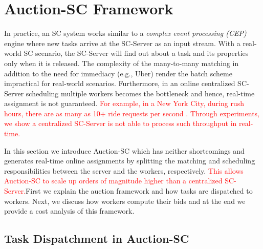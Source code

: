 \section{Auction-SC Framework}
\label{sec:onlinealgo}

In practice, an SC system works similar to a \emph{complex event processing (CEP)} engine \cite{Luckham01} where new tasks arrive at the SC-Server as an input stream. With a real-world SC scenario, the SC-Server will find out about a task and its properties only when it is released. The complexity of the many-to-many matching in addition to the need for immediacy (e.g., Uber) render the batch scheme impractical for real-world scenarios. Furthermore, in an online centralized SC-Server scheduling multiple workers becomes the bottleneck and hence, real-time assignment is not guaranteed. \textcolor{red}{For example, in a New York City, during rush hours, there are as many as 10+ ride requests per second \cite{NYCTaxi}. Through experiments, we show a centralized SC-Server is not able to process such throughput in real-time.}

In this section we introduce Auction-SC which has neither shortcomings and generates real-time online assignments by splitting the matching and scheduling responsibilities between the server and the workers, respectively. \textcolor{red}{This allows Auction-SC to scale up orders of magnitude higher than a centralized SC-Server.}First we explain the auction framework and how tasks are dispatched to workers. Next, we discuss how workers compute their bids and at the end we provide a cost analysis of this framework.

\subsection{Task Dispatchment in Auction-SC}


